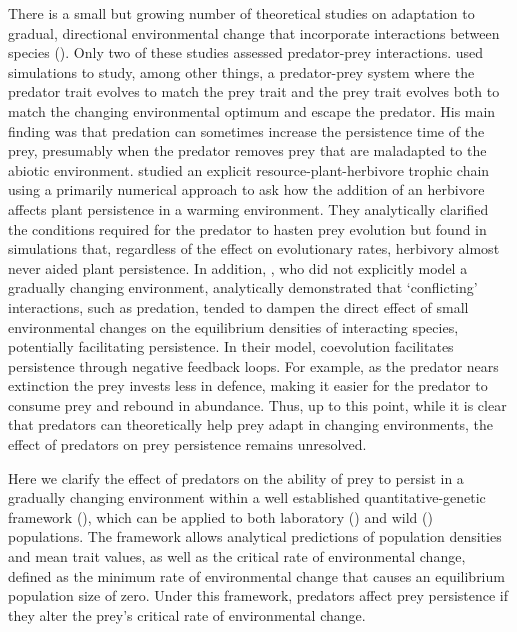 \documentclass[11pt]{article}
\begin{document}
There is a small but growing number of theoretical studies on adaptation to gradual, directional environmental change that incorporate interactions between species (\citealt{deMazancourt2008,Jones2008,Johansson2008,Norberg2012,Mellard2015}).
Only two of these studies assessed predator-prey interactions.
\cite{Jones2008} used simulations to study, among other things, a predator-prey system where the predator trait evolves to match the prey trait and the prey trait evolves both to match the changing environmental optimum and escape the predator. 
His main finding was that predation can sometimes increase the persistence time of the prey, presumably when the predator removes prey that are maladapted to the abiotic environment.
\cite{Mellard2015} studied an explicit resource-plant-herbivore trophic chain using a primarily numerical approach to ask how the addition of an herbivore affects plant persistence in a warming environment.
They analytically clarified the conditions required for the predator to hasten prey evolution but found in simulations that, regardless of the effect on evolutionary rates, herbivory almost never aided plant persistence. 
In addition, \cite{Northfield2013}, who did not explicitly model a gradually changing environment, analytically demonstrated that `conflicting' interactions, such as predation, tended to dampen the direct effect of small environmental changes on the equilibrium densities of interacting species, potentially facilitating persistence.
In their model, coevolution facilitates persistence through negative feedback loops. 
For example, as the predator nears extinction the prey invests less in defence, making it easier for the predator to consume prey and rebound in abundance.
Thus, up to this point, while it is clear that predators can theoretically help prey adapt in changing environments, the effect of predators on prey persistence remains unresolved.

Here we clarify the effect of predators on the ability of prey to persist in a gradually changing environment within a well established quantitative-genetic framework  (\citealt{Pease1989,Lynch1991,Lynch1993,Burger1995,Burger1997,Lande1996,Chevin2010}), which can be applied to both laboratory (\citealt{Willi2009}) and wild (\citealt{Gienapp2013}) populations.
The framework allows analytical predictions of population densities and mean trait values, as well as the critical rate of environmental change, defined as the minimum rate of environmental change that causes an equilibrium population size of zero.
Under this framework, predators affect prey persistence if they alter the prey's critical rate of environmental change.
\end{document}
